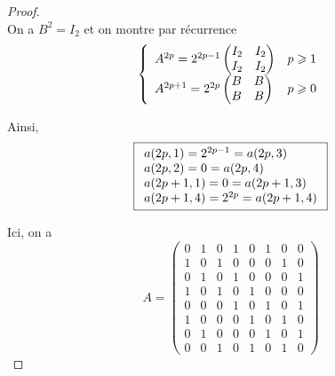 \documentclass[12pt]{article}
\begin{document}
\begin{proof}
\begin{equation}
    \end{equation}
    On a $B^{2}=I_{2}$ et on montre par récurrence
    \begin{equation}
        \left\lbrace
            \begin{array}[]{ll}
                A^{2p}=2^{2p-1}
                \begin{pmatrix}
                    I_{2} &I_{2}\\ I_{2}&I_{2}
                \end{pmatrix} &p\geqslant1\\
                A^{2p+1}=2^{2p}
                \begin{pmatrix}
                    B & B\\B &B
                \end{pmatrix}&p\geqslant0
            \end{array}
        \right.
    \end{equation}

    Ainsi,
    \begin{equation}
        \boxed{
            \begin{array}[]{l}
                a(2p,1)=2^{2p-1}=a(2p,3)\\
                a(2p,2)=0=a(2p,4)\\
                a(2p+1,1)=0=a(2p+1,3)\\
                a(2p+1,4)=2^{2p}=a(2p+1,4)\\
            \end{array}
        }
    \end{equation}

    \item Ici, on a 
    \begin{equation}
        A=
        \begin{pmatrix}
            0 &1 &0 &1 &0 &1 &0 &0\\
            1 &0 &1 &0 &0 &0 &1 &0\\
            0 &1 &0 &1 &0 &0 &0 &1\\
            1 &0 &1 &0 &1 &0 &0 &0\\
            0 &0 &0 &1 &0 &1 &0 &1\\
            1 &0 &0 &0 &1 &0 &1 &0\\
            0 &1 &0 &0 &0 &1 &0 &1\\
            0 &0 &1 &0 &1 &0 &1 &0
        \end{pmatrix}
    \end{equation}


\end{proof}
\end{document}
